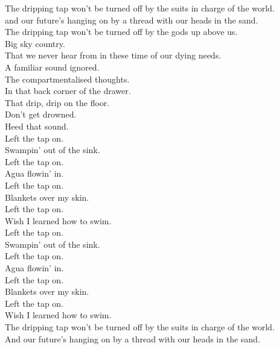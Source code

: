 
\label{album:omnium-gatherum}




The dripping tap won't be turned off by the suits in charge of the world. \\
and our future's hanging on by a thread with our heads in the sand. \\
The dripping tap won't be turned off by the gods up above us. \\
Big sky country. \\
That we never hear from in these time of our dying needs. \\

A familiar sound ignored. \\
The compartmentalised thoughts. \\
In that back corner of the drawer. \\
That drip, drip on the floor. \\

Don't get drowned. \\
Heed that sound. \\

Left the tap on. \\
Swampin' out of the sink. \\
Left the tap on. \\
Agua flowin' in. \\
Left the tap on. \\
Blankets over my skin. \\
Left the tap on. \\
Wish I learned how to swim. \\

Left the tap on. \\
Swampin' out of the sink. \\
Left the tap on. \\
Agua flowin' in. \\
Left the tap on. \\
Blankets over my skin. \\
Left the tap on. \\
Wish I learned how to swim. \\

The dripping tap won't be turned off by the suits in charge of the world. \\
And our future's hanging on by a thread with our heads in the sand. \\

